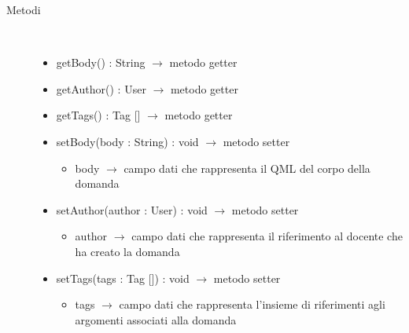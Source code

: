\begin{description}
\item[Metodi] \hfill \\
\vspace{-7mm}
\begin{itemize}
	\item getBody() : String $\rightarrow$ metodo getter
	\item getAuthor() : User $\rightarrow$ metodo getter
	\item getTags() : Tag [] $\rightarrow$ metodo getter
	\item setBody(body : String) : void $\rightarrow$ metodo setter\begin{itemize}
		\item body $\rightarrow$ campo dati che rappresenta il QML del corpo della domanda
	\end{itemize}
	
	\item setAuthor(author : User) : void $\rightarrow$ metodo setter\begin{itemize}
		\item author $\rightarrow$ campo dati che rappresenta il riferimento al docente che ha creato la domanda
	\end{itemize}
	
	\item setTags(tags : Tag []) : void $\rightarrow$ metodo setter\begin{itemize}
		\item tags $\rightarrow$ campo dati che rappresenta l'insieme di riferimenti agli argomenti associati alla domanda
	\end{itemize}
	
\end{itemize}

\end{description}

\vspace{0.5cm}
\hypertarget{server::data::Role}{}
